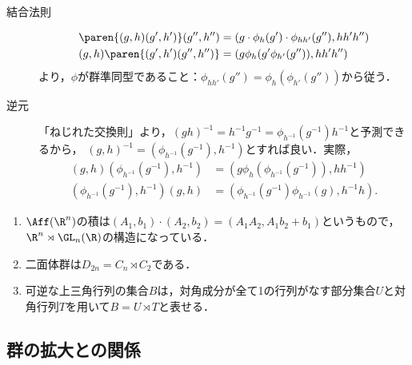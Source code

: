 \documentclass[uplatex,dvipdfmx]{jsreport}
\begin{document}
\begin{remark}[群であることの確認]\mbox{}
    \begin{description}
        \item[結合法則] \begin{align*}
            \paren{(g,h)(g',h')}(g'',h'')&=(g\cdot\phi_h(g')\cdot\phi_{hh'}(g''),hh'h'')\\
            (g,h)\paren{(g',h')(g'',h'')}&=(g\phi_h(g'\phi_{h'}(g'')),hh'h'')
        \end{align*}
        より，$\phi$が群準同型であること：$\phi_{hh'}(g'')=\phi_h(\phi_{h'}(g''))$から従う．
        \item[逆元]
        「ねじれた交換則」より，$(gh)^{-1}=h^{-1}g^{-1}=\phi_{h^{-1}}(g^{-1})h^{-1}$と予測できるから，
        $(g,h)^{-1}=(\phi_{h^{-1}}(g^{-1}),h^{-1})$とすれば良い．実際， \begin{align*}
            (g,h)(\phi_{h^{-1}}(g^{-1}),h^{-1})&=(g\phi_h(\phi_{h^{-1}}(g^{-1})),hh^{-1})\\
            (\phi_{h^{-1}}(g^{-1}),h^{-1})(g,h)&=(\phi_{h^{-1}}(g^{-1})\phi_{h^{-1}}(g),h^{-1}h).
        \end{align*}
    \end{description}
\end{remark}

\begin{example}[affine変換群の構成は半直積で定義できる]\mbox{}\label{exp-semidirect-product-1}
    \begin{enumerate}
        \item $\Aff(\R^n)$の積は$(A_1,b_1)\cdot(A_2,b_2)=(A_1A_2,A_1b_2+b_1)$というもので，
        $\R^n\rtimes\GL_n(\R)$の構造になっている．
        \item 二面体群は$D_{2n}=C_n\rtimes C_2$である．
        \item 可逆な上三角行列の集合$B$は，対角成分が全て1の行列がなす部分集合$U$と対角行列$T$を用いて$B=U\rtimes T$と表せる．
    \end{enumerate}
\end{example}

\subsection{群の拡大との関係}
\end{document}
